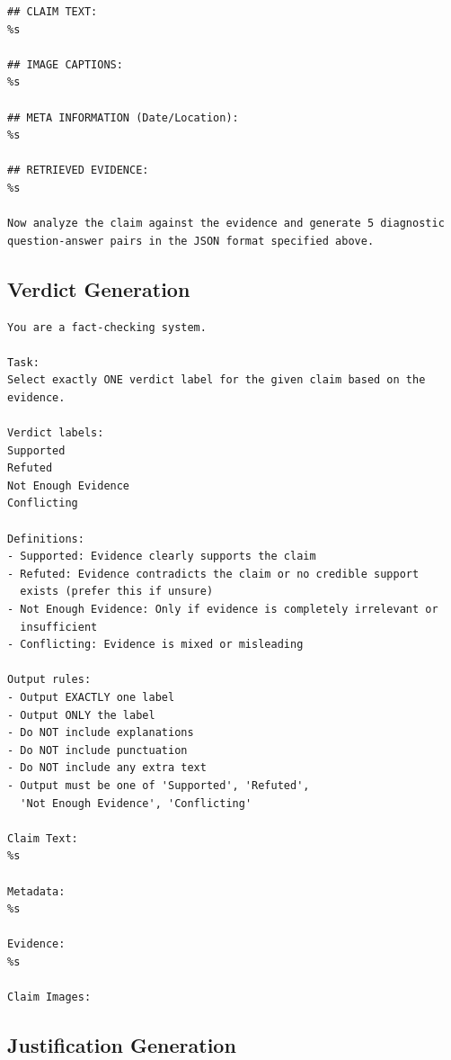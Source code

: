 \begin{verbatim}
## CLAIM TEXT:
%s

## IMAGE CAPTIONS:
%s

## META INFORMATION (Date/Location):
%s

## RETRIEVED EVIDENCE:
%s

Now analyze the claim against the evidence and generate 5 diagnostic
question-answer pairs in the JSON format specified above.
\end{verbatim}

\subsection{Verdict Generation}

\begin{verbatim}
You are a fact-checking system.

Task:
Select exactly ONE verdict label for the given claim based on the
evidence.

Verdict labels:
Supported
Refuted
Not Enough Evidence
Conflicting

Definitions:
- Supported: Evidence clearly supports the claim
- Refuted: Evidence contradicts the claim or no credible support
  exists (prefer this if unsure)
- Not Enough Evidence: Only if evidence is completely irrelevant or
  insufficient
- Conflicting: Evidence is mixed or misleading

Output rules:
- Output EXACTLY one label
- Output ONLY the label
- Do NOT include explanations
- Do NOT include punctuation
- Do NOT include any extra text
- Output must be one of 'Supported', 'Refuted',
  'Not Enough Evidence', 'Conflicting'

Claim Text:
%s

Metadata:
%s

Evidence:
%s

Claim Images:
\end{verbatim}

\subsection{Justification Generation}

